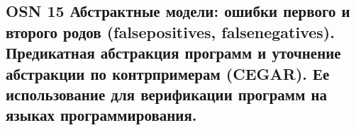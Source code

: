 \subsection{OSN 15 Абстрактные модели: ошибки первого и второго родов (falsepositives, falsenegatives). Предикатная абстракция программ и уточнение абстракции по контрпримерам (CEGAR). Ее использование для верификации программ на языках программирования.}
